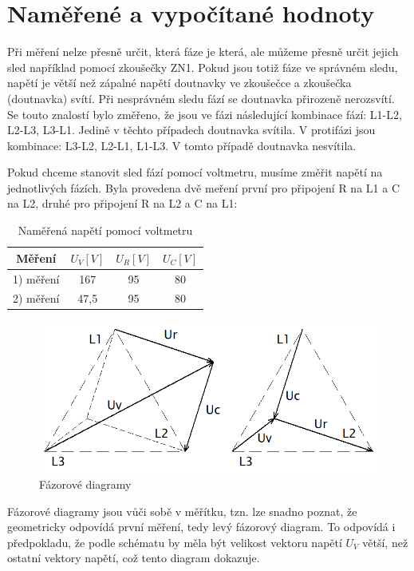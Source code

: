 \documentclass[12pt]{article} %
\begin{document}
\section{Naměřené a vypočítané hodnoty}
Při měření nelze přesně určit, která fáze je která, ale můžeme přesně určit jejich sled například pomocí zkoušečky ZN1. Pokud jsou totiž fáze ve správném sledu, napětí je větší než zápalné napětí doutnavky ve zkoušečce a zkoušečka (doutnavka) svítí. Při nesprávném sledu fází se doutnavka přirozeně nerozsvítí. Se touto znalostí bylo změřeno, že jsou ve fázi následující kombinace fází: L1-L2, L2-L3, L3-L1. Jedině v těchto případech doutnavka svítila. V protifázi jsou kombinace: L3-L2, L2-L1, L1-L3. V tomto případě doutnavka nesvítila.

Pokud chceme stanovit sled fází pomocí voltmetru, musíme změřit napětí na jednotlivých fázích. Byla provedena dvě meření první pro připojení R na L1 a C na L2, druhé pro připojení R na L2 a C na L1:
\begin{table}[H]
\center
\caption{Naměřená napětí pomocí voltmetru}
\begin{tabular}{|c|c|c|c|}
\hline 
Měření & $U_V [V]$ & $U_R [V]$ & $U_C [V]$ \\ 
\hline 
1) měření & 167 & 95 & 80 \\ 
\hline 
2) měření & 47,5 & 95 & 80 \\ 
\hline 
\end{tabular} 
\end{table}
\begin{figure}[H]
\center
\includegraphics[scale=0.6]{fazor.png}
\caption{Fázorové diagramy}
\end{figure}
Fázorové diagramy jsou vůči sobě v měřítku, tzn. lze snadno poznat, že geometricky odpovídá první měření, tedy levý fázorový diagram. To odpovídá i předpokladu, že podle schématu by měla být velikost vektoru napětí $U_V$ větší, než ostatní vektory napětí, což tento diagram dokazuje.
\end{document}
